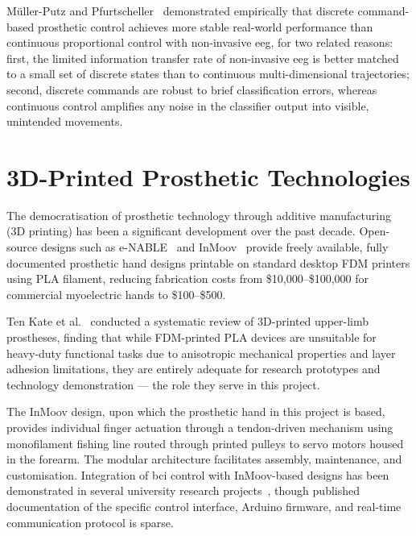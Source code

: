 M\"{u}ller-Putz and Pfurtscheller~\cite{mullerputz2008prosthetic}
demonstrated empirically that discrete command-based prosthetic
control achieves more stable real-world performance than continuous
proportional control with non-invasive \acrshort{eeg}, for two
related reasons: first, the limited information transfer rate of
non-invasive \acrshort{eeg} is better matched to a small set of
discrete states than to continuous multi-dimensional trajectories;
second, discrete commands are robust to brief classification errors,
whereas continuous control amplifies any noise in the classifier
output into visible, unintended movements.

\section{3D-Printed Prosthetic Technologies}
\label{sec:rw_3d}

The democratisation of prosthetic technology through additive
manufacturing (3D printing) has been a significant development over
the past decade. Open-source designs such as e-NABLE~\cite{enable2015}
and InMoov~\cite{langevin2026inmoov} provide freely available, fully
documented prosthetic hand designs printable on standard desktop
FDM printers using PLA filament, reducing fabrication costs from
\$10{,}000--\$100{,}000 for commercial myoelectric hands to
\$100--\$500.

Ten Kate et al.~\cite{ten2017review} conducted a systematic review
of 3D-printed upper-limb prostheses, finding that while FDM-printed
PLA devices are unsuitable for heavy-duty functional tasks due to
anisotropic mechanical properties and layer adhesion limitations,
they are entirely adequate for research prototypes and technology
demonstration — the role they serve in this project.

The InMoov design, upon which the prosthetic hand in this project
is based, provides individual finger actuation through a
tendon-driven mechanism using monofilament fishing line routed
through printed pulleys to servo motors housed in the forearm.
The modular architecture facilitates assembly, maintenance, and
customisation. Integration of \acrshort{bci} control with
InMoov-based designs has been demonstrated in several university
research projects~\cite{langevin2026inmoov}, though published
documentation of the specific control interface, Arduino firmware,
and real-time communication protocol is sparse.

